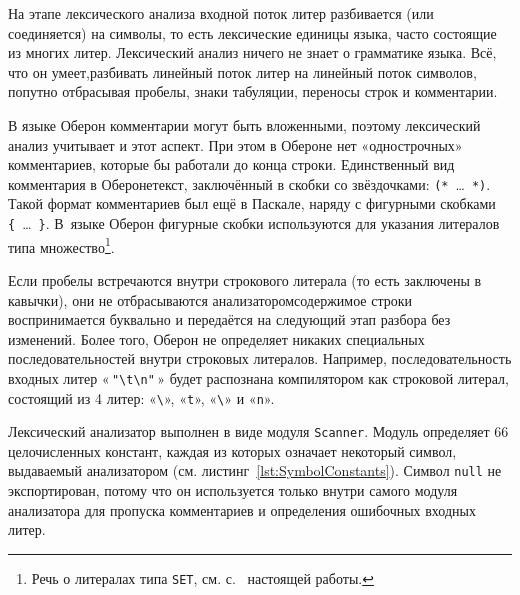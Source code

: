 \documentclass[utf8]{lgu}
\newcommand{\tire}{\unskip\nobreak\thinspace\textemdash\thinspace}
\newcommand{\code}[1]{{\normalsize\texttt{#1}}}
\begin{document}
На этапе лексического анализа входной поток литер разбивается (или соединяется) на символы, то есть лексические единицы языка, часто состоящие из многих литер. Лексический анализ ничего не знает о грамматике языка. Всё, что он умеет,\tire разбивать линейный поток литер на линейный поток символов, попутно отбрасывая пробелы, знаки табуляции, переносы строк и комментарии.

В языке Оберон комментарии могут быть вложенными, поэтому лексический анализ учитывает и этот аспект. При этом в Обероне нет «однострочных» комментариев, которые бы работали до конца строки. Единственный вид комментария в Обероне\tire текст, заключённый в скобки со звёздочками: \code{(*}~\ldots~\code{*)}. Такой формат комментариев был ещё в Паскале, наряду с фигурными скобками \code{\{}~\ldots~\code{\}}. В~языке Оберон фигурные скобки используются для указания литералов типа множество\footnote{Речь о литералах типа \code{SET}, см. с.~\pageref{OberonSets} настоящей работы.}.

Если пробелы встречаются внутри строкового литерала (то есть заключены в кавычки), они не отбрасываются анализатором\tire содержимое строки воспринимается буквально и передаётся на следующий этап разбора без изменений. Более того, Оберон не определяет никаких специальных последовательностей внутри строковых литералов. Например, последовательность входных литер «\,\code{"\textbackslash t\textbackslash n"}\,» будет распознана компилятором как строковой литерал, состоящий из 4 литер: «\code{\textbackslash}», «\code{t}», «\code{\textbackslash}» и «\code{n}».

Лексический анализатор выполнен в виде модуля \code{Scanner}. Модуль определяет 66 целочисленных констант, каждая из которых означает некоторый символ, выдаваемый анализатором (см. листинг~\ref{lst:SymbolConstants}). Символ \code{null} не экспортирован, потому что он используется только внутри самого модуля анализатора для пропуска комментариев и определения ошибочных входных литер.
\end{document}
